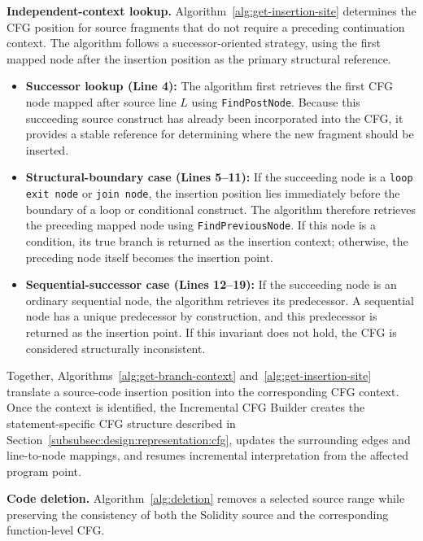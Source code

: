 \documentclass[11pt,oneside]{report}
\theoremstyle{plain}
\theoremstyle{definition}
\theoremstyle{remark}
\begin{document}
\noindent\textbf{Independent-context lookup.}
Algorithm~\ref{alg:get-insertion-site} determines the CFG position for source fragments that do not require a preceding continuation context.
The algorithm follows a successor-oriented strategy, using the first mapped node after the insertion position as the primary structural reference.

\begin{itemize}

\item \textbf{Successor lookup (Line 4):}
The algorithm first retrieves the first CFG node mapped after source line \(L\) using \texttt{FindPostNode}.
Because this succeeding source construct has already been incorporated into the CFG, it provides a stable reference for determining where the new fragment should be inserted.

\item \textbf{Structural-boundary case (Lines 5--11):}
If the succeeding node is a \texttt{loop exit node} or \texttt{join node}, the insertion position lies immediately before the boundary of a loop or conditional construct.
The algorithm therefore retrieves the preceding mapped node using \texttt{FindPreviousNode}.
If this node is a condition, its true branch is returned as the insertion context; otherwise, the preceding node itself becomes the insertion point.

\item \textbf{Sequential-successor case (Lines 12--19):}
If the succeeding node is an ordinary sequential node, the algorithm retrieves its predecessor.
A sequential node has a unique predecessor by construction, and this predecessor is returned as the insertion point.
If this invariant does not hold, the CFG is considered structurally inconsistent.

\end{itemize}

Together, Algorithms~\ref{alg:get-branch-context} and~\ref{alg:get-insertion-site} translate a source-code insertion position into the corresponding CFG context.
Once the context is identified, the Incremental CFG Builder creates the statement-specific CFG structure described in Section~\ref{subsubsec:design:representation:cfg}, updates the surrounding edges and line-to-node mappings, and resumes incremental interpretation from the affected program point.

\smallskip
\noindent\textbf{Code deletion.} Algorithm~\ref{alg:deletion} removes a selected source range while preserving the consistency of both the Solidity source and the corresponding function-level CFG.
\end{document}
